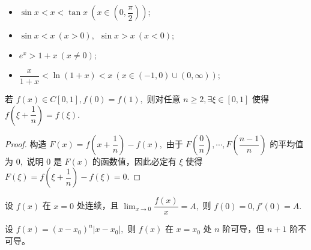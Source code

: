 \begin{Appendices}
\newpage


\begin{itemize}
    \item $ \sin x < x <\tan x\ ( x \in (0,\dfrac{\pi}{2})); $ 
    \item $ \sin x < x\ (x > 0),\ \ \sin x > x\ (x < 0); $ 
    \item $ e^x > 1 + x\ (x \neq 0); $ 
    \item $ \dfrac{x}{1+x}<\ln(1+x)<x\ (x \in (-1,0)\cup(0,\infty)); $ 
\end{itemize}


若 $ f(x)\in C[0,1],f(0) = f(1), $ 则对任意 $ n\geq 2,\exists \xi\in [0,1] $ 
使得 $ f(\xi+\dfrac{1}{n}) = f(\xi). $ 
\begin{proof}
    构造 $ F(x) = f(x + \dfrac{1}{n}) - f(x), $ 
    由于 $ F(\dfrac{0}{n}),\cdots,F(\dfrac{n-1}{n}) $ 的平均值为 $ 0, $ 
    说明 $ 0 $ 是 $ F(x) $ 的函数值，因此必定有 $ \xi $ 使得
    $ F(\xi) = f(\xi + \dfrac{1}{n}) - f(\xi) = 0. $ 
\end{proof}


设 $ f(x) $ 在 $ x = 0 $ 处连续，且 $ {\displaystyle\lim_{x\rightarrow 0}}\dfrac{f(x)}{x} = A, $ 则
$ f(0) = 0,f'(0) = A. $ 


设 $ f(x) = (x-x_0)^n|x-x_0|, $ 则 $ f(x) $ 在 $ x = x_0 $ 处 $ n $ 阶可导，但 $ n+1 $ 阶不可导。



\end{Appendices}
